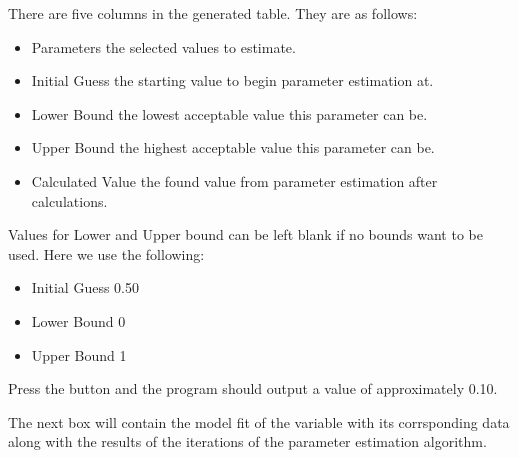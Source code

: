 \documentclass[letterpaper,10pt,english]{sphinxmanual}
\begin{document}
\sphinxAtStartPar
There are five columns in the generated table. They are as follows:
\begin{itemize}
\item {} 
\sphinxAtStartPar
Parameters \sphinxhyphen{} the selected values to estimate.

\item {} 
\sphinxAtStartPar
Initial Guess \sphinxhyphen{} the starting value to begin parameter estimation at.

\item {} 
\sphinxAtStartPar
Lower Bound \sphinxhyphen{} the lowest acceptable value this parameter can be.

\item {} 
\sphinxAtStartPar
Upper Bound \sphinxhyphen{} the highest acceptable value this parameter can be.

\item {} 
\sphinxAtStartPar
Calculated Value \sphinxhyphen{} the found value from parameter estimation after calculations.

\end{itemize}

\sphinxAtStartPar
Values for Lower and Upper bound can be left blank if no bounds want to be used.
Here we use the following:
\begin{itemize}
\item {} 
\sphinxAtStartPar
Initial Guess \sphinxhyphen{} 0.50

\item {} 
\sphinxAtStartPar
Lower Bound \sphinxhyphen{} 0

\item {} 
\sphinxAtStartPar
Upper Bound \sphinxhyphen{} 1

\end{itemize}

\sphinxAtStartPar
Press the  button and the program should output a value of approximately
0.10.

\begin{figure}[htbp]
\centering

\noindent{}
\end{figure}

\sphinxAtStartPar
The next box  will contain the model fit of the variable
with its corrsponding data along with the results of the iterations of the
parameter estimation algorithm.

\begin{figure}[htbp]
\centering

\noindent{}
\end{figure}
\end{document}
